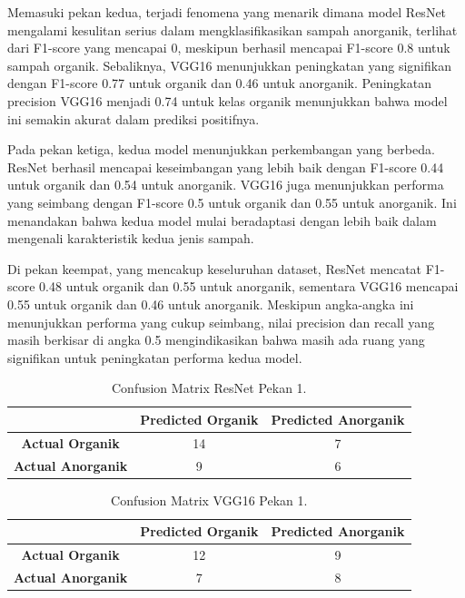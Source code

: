 \documentclass[12pt,a4paper]{article}
\begin{document}
Memasuki pekan kedua, terjadi fenomena yang menarik dimana model ResNet mengalami kesulitan serius dalam mengklasifikasikan sampah anorganik, terlihat dari F1-score yang mencapai 0, meskipun berhasil mencapai F1-score 0.8 untuk sampah organik. Sebaliknya, VGG16 menunjukkan peningkatan yang signifikan dengan F1-score 0.77 untuk organik dan 0.46 untuk anorganik. Peningkatan precision VGG16 menjadi 0.74 untuk kelas organik menunjukkan bahwa model ini semakin akurat dalam prediksi positifnya.

Pada pekan ketiga, kedua model menunjukkan perkembangan yang berbeda. ResNet berhasil mencapai keseimbangan yang lebih baik dengan F1-score 0.44 untuk organik dan 0.54 untuk anorganik. VGG16 juga menunjukkan performa yang seimbang dengan F1-score 0.5 untuk organik dan 0.55 untuk anorganik. Ini menandakan bahwa kedua model mulai beradaptasi dengan lebih baik dalam mengenali karakteristik kedua jenis sampah.

Di pekan keempat, yang mencakup keseluruhan dataset, ResNet mencatat F1-score 0.48 untuk organik dan 0.55 untuk anorganik, sementara VGG16 mencapai 0.55 untuk organik dan 0.46 untuk anorganik. Meskipun angka-angka ini menunjukkan performa yang cukup seimbang, nilai precision dan recall yang masih berkisar di angka 0.5 mengindikasikan bahwa masih ada ruang yang signifikan untuk peningkatan performa kedua model.


\begin{table}[H]
\centering
\begin{tabular}{|c|c|c|}
    \hline
    & \textbf{Predicted Organik} & \textbf{Predicted Anorganik} \\
    \hline
    \textbf{Actual Organik} & 14 & 7 \\
    \hline
    \textbf{Actual Anorganik} & 9 & 6 \\
    \hline
\end{tabular}
\caption{Confusion Matrix ResNet Pekan 1.}
\end{table}

\begin{table}[H]
\centering
\begin{tabular}{|c|c|c|}
    \hline
    & \textbf{Predicted Organik} & \textbf{Predicted Anorganik} \\
    \hline
    \textbf{Actual Organik} & 12 & 9 \\
    \hline
    \textbf{Actual Anorganik} & 7 & 8 \\
    \hline
\end{tabular}
\caption{Confusion Matrix VGG16 Pekan 1.}
\end{table}
\end{document}
